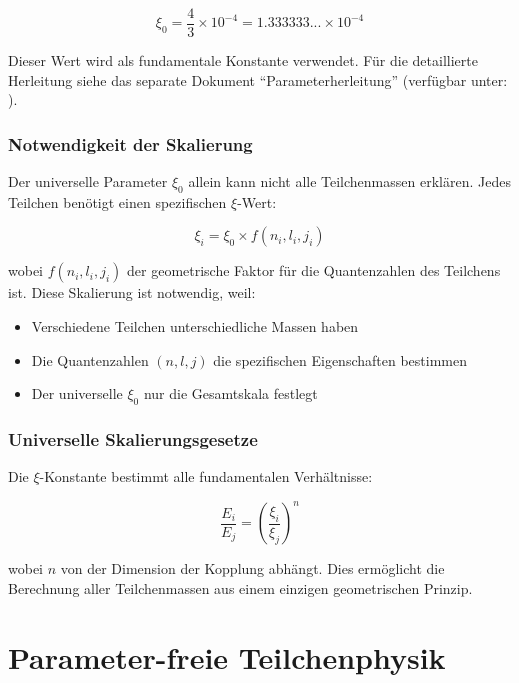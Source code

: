 \begin{equation}
	\boxed{\xi_0 = \frac{4}{3} \times 10^{-4} = 1.333333... \times 10^{-4}}
\end{equation}

	Dieser Wert wird als fundamentale Konstante verwendet. Für die detaillierte Herleitung 
	siehe das separate Dokument ``Parameterherleitung'' 
	(verfügbar unter: ).

\subsection{Notwendigkeit der Skalierung}

Der universelle Parameter $\xi_0$ allein kann nicht alle Teilchenmassen erklären. Jedes Teilchen benötigt einen spezifischen $\xi$-Wert:

\begin{equation}
	\xi_i = \xi_0 \times f(n_i, l_i, j_i)
\end{equation}

wobei $f(n_i, l_i, j_i)$ der geometrische Faktor für die Quantenzahlen des Teilchens ist. Diese Skalierung ist notwendig, weil:

\begin{itemize}
	\item Verschiedene Teilchen unterschiedliche Massen haben
	\item Die Quantenzahlen $(n, l, j)$ die spezifischen Eigenschaften bestimmen
	\item Der universelle $\xi_0$ nur die Gesamtskala festlegt
\end{itemize}

\subsection{Universelle Skalierungsgesetze}

Die $\xi$-Konstante bestimmt alle fundamentalen Verhältnisse:

\begin{equation}
	\frac{E_i}{E_j} = \left(\frac{\xi_i}{\xi_j}\right)^n
\end{equation}

wobei $n$ von der Dimension der Kopplung abhängt. Dies ermöglicht die Berechnung aller Teilchenmassen aus einem einzigen geometrischen Prinzip.

	\chapter{Parameter-freie Teilchenphysik}
	
